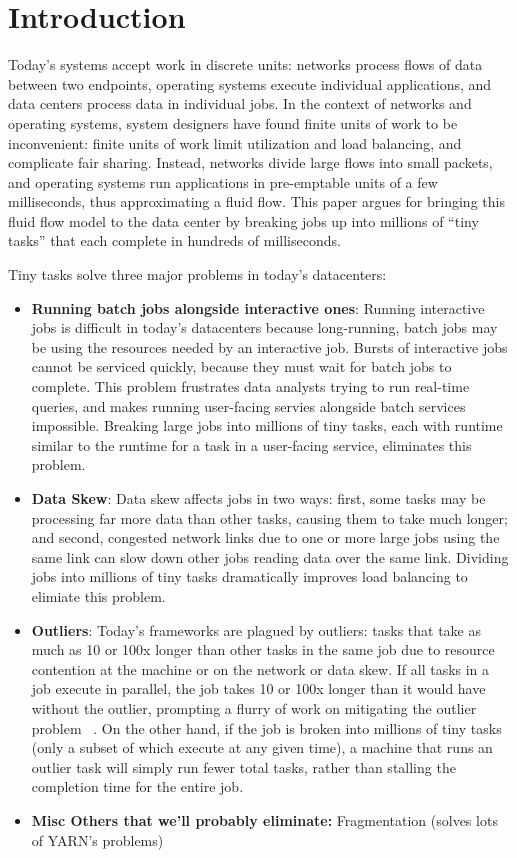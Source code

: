 \section{Introduction}
Today's systems accept work in discrete units: networks process flows of data
between two endpoints, operating systems execute individual applications, and
data centers process data in individual jobs.  In the context of networks and
operating systems, system designers have found finite units of work to be
inconvenient: finite units of work limit utilization and load balancing,
and complicate fair sharing.  Instead, networks divide large flows into small
packets, and operating systems run applications in pre-emptable units of a 
few milliseconds, thus approximating a fluid flow.  This paper argues for
bringing this fluid flow model to the data center by breaking jobs up into
millions of ``tiny tasks'' that each complete in hundreds of milliseconds.

Tiny tasks solve three major problems in today's datacenters:
\begin{itemize}
\item \textbf{Running batch jobs alongside interactive ones}: Running interactive
jobs is difficult in today's datacenters because long-running, batch jobs may be
using the resources needed by an interactive job. Bursts of interactive jobs
cannot be serviced quickly, because they must wait for batch jobs to complete.
This problem frustrates data analysts trying to run real-time queries, and makes
running user-facing servies alongside batch services impossible. Breaking large
jobs into millions of tiny tasks, each with runtime similar to the runtime for a
task in a user-facing service, eliminates this problem.
\item \textbf{Data Skew}: Data skew affects jobs in two ways: first, some tasks
may be processing far more data than other tasks, causing them to take much
longer; and second, congested network links due to one or more large jobs using
the same link can slow down other jobs reading data over the same link. Dividing
jobs into millions of tiny tasks dramatically improves load balancing to elimiate
this problem.
\item \textbf{Outliers}: Today's frameworks are plagued by outliers: tasks that
take as much as 10 or 100x longer than other tasks in the same job due to
resource contention at the machine or on the network or data skew.  If all tasks in a job execute in parallel, the job takes 10 or 100x longer than it would
have without the outlier, prompting a flurry of work on mitigating the outlier
problem ~\cite{blah,blah,blah}. On the other hand, if the job is broken into millions of tiny tasks (only a subset of which execute at any given time), a machine
that runs an outlier task will simply run fewer total tasks, rather than
stalling the completion time for the entire job.
\item \textbf{Misc Others that we'll probably eliminate:} Fragmentation (solves
lots of YARN's problems)
\end{itemize}

